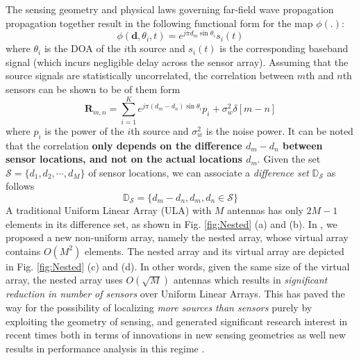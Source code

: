 The sensing geometry and physical laws governing far-field wave propagation propagation together result in the following functional form for the map $\phi(.)$: \[ \phi(\mathbf{d},\theta_i,t) =  e^{j\pi d_m \sin\theta_i}s_i(t)  \]
where $\theta_i$ is the DOA of the $i$th source and $s_i(t)$ is the corresponding baseband signal (which incurs negligible delay across the sensor array). Assuming that the source signals are statistically uncorrelated, the correlation between $m$th and $n$th sensors can be shown to be of them form \[ \mathbf{R}_{m,n} = \sum_{i=1}^{K}e^{j\pi (d_m-d_n)\sin\theta_i} p_i + \sigma^2_w\delta[m-n] \]
where $p_i$ is the power of the $i$th source and $\sigma^2_w$ is the noise power. 
It can be noted that the correlation {\bf only depends on the difference $d_m-d_n$ between sensor locations, and not on the actual locations $d_m$}. %
Given the set $\mathcal{S} = \{d_1,d_2,\cdots, d_M\} $ of sensor locations,  we can associate a {\em difference set} $\mathbb{D}_{\mathcal{S}}$ as follows \[ \mathbb{D}_{\mathcal{S}}=\{d_m-d_n, d_m, d_n\in \mathcal{S} \} \] 
A traditional Uniform Linear Array (ULA) with $M$ antennas has only $2M-1$ elements in its difference set, as shown in Fig. \ref{fig:Nested} (a) and (b). In \cite{PiyaNested}, we proposed a new non-uniform array, namely the nested array, whose virtual array contains $O(M^2)$ elements. 
The nested array and its virtual array are depicted in Fig. \ref{fig:Nested} (c) and (d). In other words, given the same size of the virtual array, the nested array uses $O(\sqrt{M})$ antennas which results in {\em significant reduction in number of sensors} over Uniform Linear Arrays. This has paved the way for the possibility of localizing {\em more sources than sensors} purely by exploiting the geometry of sensing, and generated significant research interest in recent times both in terms of innovations in new sensing geometries \cite{GCA,han2014nested,hanTensor} as well new results in performance analysis in this regime \cite{koochakzadeh2016cramer,koochakzadeh2017performance,wang2017coarrays,tan2014direction}. \\


